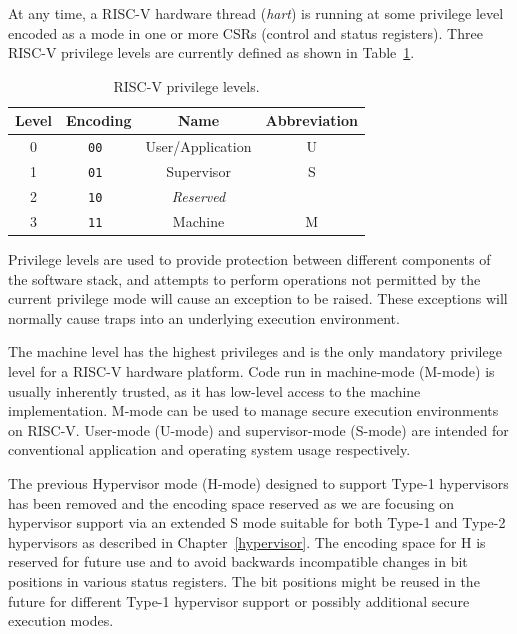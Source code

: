 At any time, a RISC-V hardware thread ({\em hart}) is running at some
privilege level encoded as a mode in one or more CSRs (control and
status registers).  Three RISC-V privilege levels are currently defined
as shown in Table~\ref{privlevels}.

\begin{table}[h!]
\begin{center}
\begin{tabular}{|c|c|c|c|}
  \hline
   Level & Encoding & Name      & Abbreviation \\ \hline  
   0     & \tt 00   & User/Application & U     \\ 
   1     & \tt 01   & Supervisor & S           \\ 
   2     & \tt 10   & {\em Reserved} &            \\ 
   3     & \tt 11   & Machine    & M           \\ 
  \hline
 \end{tabular}
\end{center}
\caption{RISC-V privilege levels.}
\label{privlevels}
\end{table}

Privilege levels are used to provide protection between different
components of the software stack, and attempts to perform operations
not permitted by the current privilege mode will cause an exception to
be raised.  These exceptions will normally cause traps into an
underlying execution environment.

The machine level has the highest privileges and is the only mandatory
privilege level for a RISC-V hardware platform.  Code run in
machine-mode (M-mode) is usually inherently trusted, as it has
low-level access to the machine implementation.  M-mode can be used to
manage secure execution environments on RISC-V.  User-mode (U-mode)
and supervisor-mode (S-mode) are intended for conventional application
and operating system usage respectively.

\begin{commentary}
The previous Hypervisor mode (H-mode) designed to support Type-1
hypervisors has been removed and the encoding space reserved as we are
focusing on hypervisor support via an extended S mode suitable for
both Type-1 and Type-2 hypervisors as described in
Chapter~\ref{hypervisor}.  The encoding space for H is reserved for
future use and to avoid backwards incompatible changes in bit
positions in various status registers.  The bit positions might be
reused in the future for different Type-1 hypervisor support or
possibly additional secure execution modes.
\end{commentary}

